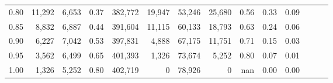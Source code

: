 \begin{tabular}{rrrrrrrrrrrrrr}
0.80 &  11,292 &  6,653 &  0.37 &  382,772 &   19,947 &  53,246 &  25,680 &  0.56 &  0.33 &      0.09 \\
0.85 &   8,832 &  6,887 &  0.44 &  391,604 &   11,115 &  60,133 &  18,793 &  0.63 &  0.24 &      0.06 \\
0.90 &   6,227 &  7,042 &  0.53 &  397,831 &    4,888 &  67,175 &  11,751 &  0.71 &  0.15 &      0.03 \\
0.95 &   3,562 &  6,499 &  0.65 &  401,393 &    1,326 &  73,674 &   5,252 &  0.80 &  0.07 &      0.01 \\
1.00 &   1,326 &  5,252 &  0.80 &  402,719 &        0 &  78,926 &       0 &   nan &  0.00 &      0.00 \\
\bottomrule
\end{tabular}

